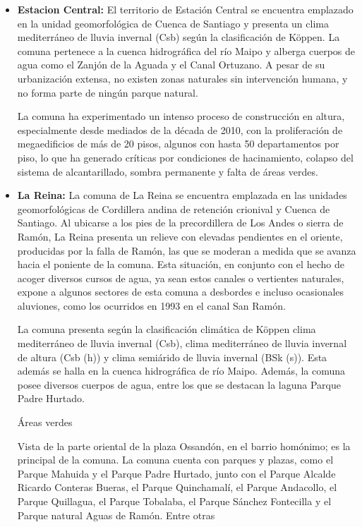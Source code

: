 \begin{itemize}
    \item \textbf{Estacion Central:}
    El territorio de Estación Central se encuentra emplazado en la unidad geomorfológica de Cuenca de Santiago y presenta un clima mediterráneo de lluvia invernal (Csb) según la clasificación de Köppen.
 La comuna pertenece a la cuenca hidrográfica del río Maipo y alberga cuerpos de agua como el Zanjón de la Aguada y el Canal Ortuzano.
 A pesar de su urbanización extensa, no existen zonas naturales sin intervención humana, y no forma parte de ningún parque natural.
 
 La comuna ha experimentado un intenso proceso de construcción en altura, especialmente desde mediados de la década de 2010, con la proliferación de megaedificios de más de 20 pisos, algunos con hasta 50 departamentos por piso, lo que ha generado críticas por condiciones de hacinamiento, colapso del sistema de alcantarillado, sombra permanente y falta de áreas verdes.
    \item \textbf{La Reina:}
    La comuna de La Reina se encuentra emplazada en las unidades geomorfológicas de Cordillera andina de retención crionival y Cuenca de Santiago. Al ubicarse a los pies de la precordillera de Los Andes o sierra de Ramón, La Reina presenta un relieve con elevadas pendientes en el oriente, producidas por la falla de Ramón, las que se moderan a medida que se avanza hacia el poniente de la comuna. Esta situación, en conjunto con el hecho de acoger diversos cursos de agua, ya sean estos canales o vertientes naturales, expone a algunos sectores de esta comuna a desbordes e incluso ocasionales aluviones, como los ocurridos en 1993 en el canal San Ramón.

La comuna presenta según la clasificación climática de Köppen clima mediterráneo de lluvia invernal (Csb), clima mediterráneo de lluvia invernal de altura (Csb (h)) y clima semiárido de lluvia invernal (BSk (s)). Esta además se halla en la cuenca hidrográfica de río Maipo. Además, la comuna posee diversos cuerpos de agua, entre los que se destacan la laguna Parque Padre Hurtado.

Áreas verdes

Vista de la parte oriental de la plaza Ossandón, en el barrio homónimo; es la principal de la comuna.
La comuna cuenta con parques y plazas, como el Parque Mahuida y el Parque Padre Hurtado, junto con el Parque Alcalde Ricardo Conteras Bueras, el Parque Quinchamalí, el Parque Andacollo, el Parque Quillagua, el Parque Tobalaba, el Parque Sánchez Fontecilla y el Parque natural Aguas de Ramón. Entre otras
    

\end{itemize}
